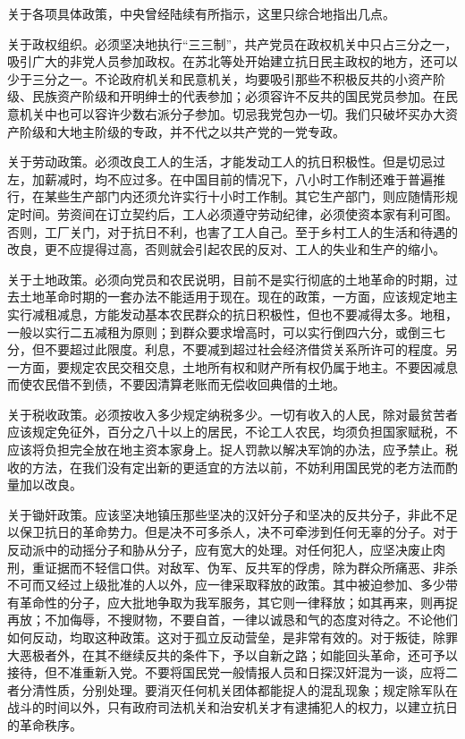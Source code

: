 关于各项具体政策，中央曾经陆续有所指示，这里只综合地指出几点。

关于政权组织。必须坚决地执行“三三制”，共产党员在政权机关中只占三分之一，吸引广大的非党人员参加政权。在苏北等处开始建立抗日民主政权的地方，还可以少于三分之一。不论政府机关和民意机关，均要吸引那些不积极反共的小资产阶级、民族资产阶级和开明绅士的代表参加；必须容许不反共的国民党员参加。在民意机关中也可以容许少数右派分子参加。切忌我党包办一切。我们只破坏买办大资产阶级和大地主阶级的专政，并不代之以共产党的一党专政。

关于劳动政策。必须改良工人的生活，才能发动工人的抗日积极性。但是切忌过左，加薪减时，均不应过多。在中国目前的情况下，八小时工作制还难于普遍推行，在某些生产部门内还须允许实行十小时工作制。其它生产部门，则应随情形规定时间。劳资间在订立契约后，工人必须遵守劳动纪律，必须使资本家有利可图。否则，工厂关门，对于抗日不利，也害了工人自己。至于乡村工人的生活和待遇的改良，更不应提得过高，否则就会引起农民的反对、工人的失业和生产的缩小。

关于土地政策。必须向党员和农民说明，目前不是实行彻底的土地革命的时期，过去土地革命时期的一套办法不能适用于现在。现在的政策，一方面，应该规定地主实行减租减息，方能发动基本农民群众的抗日积极性，但也不要减得太多。地租，一般以实行二五减租为原则；到群众要求增高时，可以实行倒四六分，或倒三七分，但不要超过此限度。利息，不要减到超过社会经济借贷关系所许可的程度。另一方面，要规定农民交租交息，土地所有权和财产所有权仍属于地主。不要因减息而使农民借不到债，不要因清算老账而无偿收回典借的土地。

关于税收政策。必须按收入多少规定纳税多少。一切有收入的人民，除对最贫苦者应该规定免征外，百分之八十以上的居民，不论工人农民，均须负担国家赋税，不应该将负担完全放在地主资本家身上。捉人罚款以解决军饷的办法，应予禁止。税收的方法，在我们没有定出新的更适宜的方法以前，不妨利用国民党的老方法而酌量加以改良。

关于锄奸政策。应该坚决地镇压那些坚决的汉奸分子和坚决的反共分子，非此不足以保卫抗日的革命势力。但是决不可多杀人，决不可牵涉到任何无辜的分子。对于反动派中的动摇分子和胁从分子，应有宽大的处理。对任何犯人，应坚决废止肉刑，重证据而不轻信口供。对敌军、伪军、反共军的俘虏，除为群众所痛恶、非杀不可而又经过上级批准的人以外，应一律采取释放的政策。其中被迫参加、多少带有革命性的分子，应大批地争取为我军服务，其它则一律释放；如其再来，则再捉再放；不加侮辱，不搜财物，不要自首，一律以诚恳和气的态度对待之。不论他们如何反动，均取这种政策。这对于孤立反动营垒，是非常有效的。对于叛徒，除罪大恶极者外，在其不继续反共的条件下，予以自新之路；如能回头革命，还可予以接待，但不准重新入党。不要将国民党一般情报人员和日探汉奸混为一谈，应将二者分清性质，分别处理。要消灭任何机关团体都能捉人的混乱现象；规定除军队在战斗的时间以外，只有政府司法机关和治安机关才有逮捕犯人的权力，以建立抗日的革命秩序。

